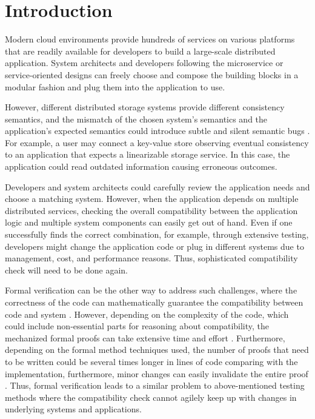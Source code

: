 \section{Introduction}

Modern cloud environments provide hundreds of services on various platforms
that are readily available for developers to build a
large-scale distributed application. System architects and developers
following the
microservice or service-oriented designs can freely
choose and compose the building blocks in a modular fashion and plug them
into the application to use.

However, different distributed storage systems provide different consistency
semantics, and the mismatch of the chosen system's semantics and the
application's expected semantics could introduce subtle and silent
semantic bugs \cite{silentbugs}. For example, a user may connect a
key-value store
observing eventual consistency to an application that expects a
linearizable storage service. In this case, the application could
read outdated information causing erroneous outcomes.

Developers and system architects could carefully review the
application needs and choose a
matching system. However, when the application depends on multiple
distributed services, checking the overall compatibility between the
application logic and multiple system components can easily get out
of hand. Even
if one successfully finds the correct combination, for example, through
extensive testing, developers might change the application code or
plug in different systems due to management, cost, and performance
reasons. Thus, sophisticated compatibility check will need to be done again.


Formal verification can be the other way to address such challenges,
where the correctness of the code can mathematically guarantee the
compatibility between code and system \cite{lampson2021hints}.
However, depending on
the complexity of the code, which could include non-essential parts
for reasoning about compatibility, the mechanized formal proofs
can take extensive time and effort \cite{certikos-osdi16,
klein2009sel4, wormspace}.
Furthermore, depending on the formal method techniques used, the
number of proofs that need to be
written could be several times longer in lines of code comparing with
the implementation,
furthermore, minor changes can easily invalidate the entire proof
\cite{klein2009sel4}.
Thus, formal verification
leads to a similar problem to above-mentioned testing methods where
the compatibility check
cannot agilely keep up with changes in underlying systems and
applications.

